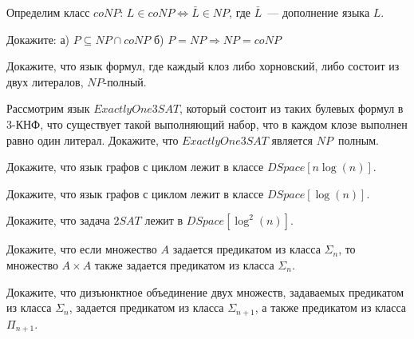 \setcounter{curtask}{31}


Определим класс $coNP$: $L \in coNP \Leftrightarrow \bar{L} \in NP$, где
$\bar{L}$~--- дополнение языка $L$.


\begin{task}
	Докажите:
    а) $P \subseteq NP \cap coNP$
    б) $P = NP \Rightarrow NP = coNP$
\end{task}

\begin{task}
	Докажите, что язык формул, где каждый клоз либо хорновский, либо состоит из двух
    литералов, $NP$-полный.
\end{task}

\begin{task}
    Рассмотрим язык $Exactly One 3SAT$, который состоит из таких булевых формул в
    $3$-КНФ, что существует такой выполняющий набор, что в каждом клозе выполнен
    равно один литерал. Докажите, что $Exactly One 3SAT$ является $NP$~полным.
\end{task}

\begin{task}
    Докажите, что язык графов с циклом лежит в классе $DSpace[n \log(n)]$.
\end{task}

\begin{task}
    Докажите, что язык графов с циклом лежит в классе $DSpace[\log(n)]$.
\end{task}

\begin{task}
	Докажите, что задача $2SAT$ лежит в $DSpace[\log^2(n)]$.    
\end{task}



\breakline


\begin{ptask}{23}
    Докажите, что если множество $A$ задается предикатом из класса $\Sigma_n$, то
    множество $A \times A$ также задается предикатом из класса $\Sigma_n$.
\end{ptask}

\begin{ptask}{24}
    Докажите, что дизъюнктное объединение двух множеств, задаваемых предикатом из
    класса $\Sigma_n$, задается предикатом из класса $\Sigma_{n + 1}$, а также
    предикатом из класса $\Pi_{n + 1}$.
\end{ptask}